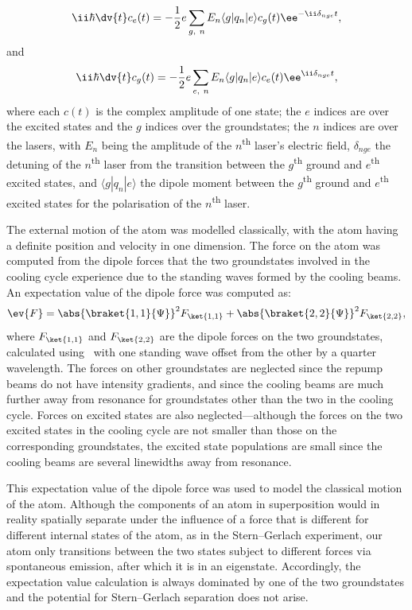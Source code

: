 \begin{equation}
\ii\hbar\dv{t} c_e(t) = -\frac12e\sum_{g,\ n} E_n \langle g |  q_n | e \rangle c_g(t) \ee^{-\ii\delta_{nge}t},
\end{equation}
and
\begin{equation}
\ii\hbar\dv{t} c_g(t) = -\frac12e\sum_{e,\ n} E_n \langle g |  q_n | e \rangle c_e(t) \ee^{\ii\delta_{nge}t},
\end{equation}
where each $c(t)$ is the complex amplitude of one state; the $e$ indices are over the excited states and the $g$ indices over the groundstates; the $n$ indices are over the lasers, with $E_n$ being the amplitude of the $n$\textsuperscript{th} laser's electric field, $\delta_{nge}$ the detuning of the $n$\textsuperscript{th} laser from the transition between the $g$\textsuperscript{th} ground and $e$\textsuperscript{th} excited states, and $\langle g |  q_n | e \rangle$ the dipole moment between the $g$\textsuperscript{th} ground and $e$\textsuperscript{th} excited states for the polarisation of the $n$\textsuperscript{th} laser.

The external motion of the atom was modelled classically, with the atom having a definite position and velocity in one dimension. The force on the atom was computed from the dipole forces that the two groundstates involved in the cooling cycle experience due to the standing waves formed by the cooling beams. An expectation value of the dipole force was computed as:
\begin{align}
\ev{F} = \abs{\braket{1, 1}{\Psi}}^2F_{\ket{1, 1}} + \abs{\braket{2, 2}{\Psi}}^2F_{\ket{2, 2}},
\end{align}
where $F_{\ket{1, 1}}$ and $F_{\ket{2, 2}}$ are the dipole forces on the two groundstates, calculated using~\cite[eqn 3.16, p 33]{metcalf_laser_1999} with one standing wave offset from the other by a quarter wavelength. The forces on other groundstates are neglected since the repump beams do not have intensity gradients, and since the cooling beams are much further away from resonance for groundstates other than the two in the cooling cycle. Forces on excited states are also neglected---although the forces on the two excited states in the cooling cycle are not smaller than those on the corresponding groundstates, the excited state populations are small since the cooling beams are several linewidths away from resonance.

This expectation value of the dipole force was used to model the classical motion of the atom. Although the components of an atom in superposition would in reality spatially separate under the influence of a force that is different for different internal states of the atom, as in the Stern--Gerlach experiment, our atom only transitions between the two states subject to different forces via spontaneous emission, after which it is in an eigenstate. Accordingly, the expectation value calculation is always dominated by one of the two groundstates and the potential for Stern--Gerlach separation does not arise.

